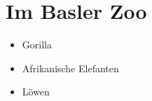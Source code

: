 \section{Im Basler Zoo}

\begin{itemize}
 
\item Gorilla
 
\item Afrikanische Elefanten
 
\item Löwen

\end{itemize}
   

